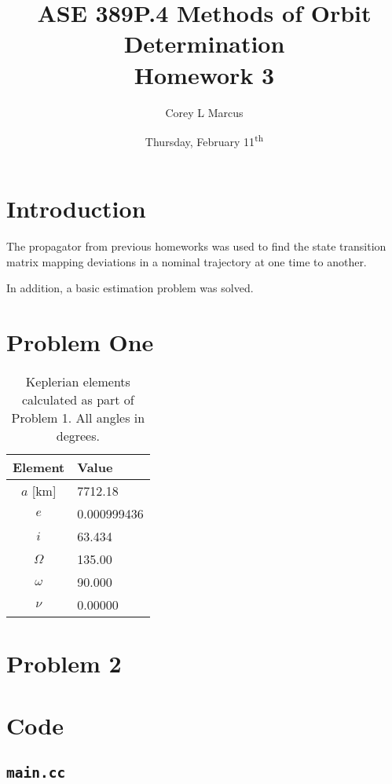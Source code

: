 \documentclass[11pt]{article}
\title{ASE 389P.4 Methods of Orbit Determination \\ Homework 3}
\author{Corey L Marcus} \date{Thursday, February 11\textsuperscript{th}}
\begin{document}
\onehalfspace
\maketitle


\section{Introduction}

The propagator from previous homeworks was used to find the state transition matrix mapping deviations in a nominal trajectory at one time to another.

In addition, a basic estimation problem was solved.

\section{Problem One}

\begin{table}[ht!]
	\centering
	\begin{tabular}{c|l}
		Element  & Value \\ \hline
		$a$ [km]      &    7712.18   \\
		$e$      &   0.000999436    \\
		$i$      &   63.434    \\
		$\Omega$ &   135.00    \\
		$\omega$ &   90.000    \\
		$\nu$    &   0.00000   
	\end{tabular}
	\caption{Keplerian elements calculated as part of Problem 1. All angles in degrees.}
	\label{tb:kepler}
\end{table}

\section{Problem 2}

\newpage
\appendix
\section{Code}

\subsection{\texttt{main.cc}}

\end{document}
